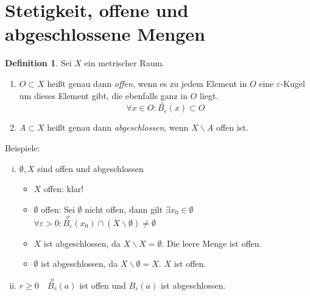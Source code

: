 \documentclass[ngerman,titlepage,twoside, parskip=half*]{scrreprt}
\theoremstyle{plain}
\theoremstyle{definition}
\newtheorem{definition}{Definition}
\theoremstyle{remark}
\begin{document}
\section{Stetigkeit, offene und abgeschlossene Mengen}
\begin{definition}
Sei $X$ ein metrischer Raum.
\begin{enumerate}[(1)]
\item $O\subset X$ heißt genau dann \emph{offen},
  wenn es zu jedem Element in $O$ eine $\varepsilon$-Kugel um dieses
  Element gibt, die ebenfalls ganz in $O$ liegt.
  \[\forall x\in O\colon\stackrel{\circ}{B_{\varepsilon}}(x)\subset O\]
\item $A\subset X$ heißt genau dann
  \emph{abgeschlossen}, wenn
  $X\backslash A$ offen ist.
\end{enumerate}
\end{definition}
Beispiele:
\begin{enumerate}[(i)]
  \item $\emptyset, X$ sind offen und abgeschlossen
    \begin{itemize}
      \item $X$ offen: klar!
      \item $\emptyset$ offen: Sei $\emptyset$ nicht offen, dann gilt
        $\exists x_0\in \emptyset$ \lightning $\forall \varepsilon>0\colon
        \stackrel{o}{B_{\varepsilon}}(x_0)\cap (X\backslash
        \emptyset)\neq \emptyset$\lightning 
      \item $X$ ist abgeschlossen, da $X\backslash X=\emptyset$. Die leere Menge ist offen.
      \item $\emptyset$ ist abgeschlossen, da $X\backslash \emptyset=X$. $X$ ist offen.
    \end{itemize}
  \item $r\geq 0\quad \stackrel{o}{B_r}(a)$ ist offen und $B_r(a)$ ist abgeschlossen.
\end{enumerate}
\end{document}
